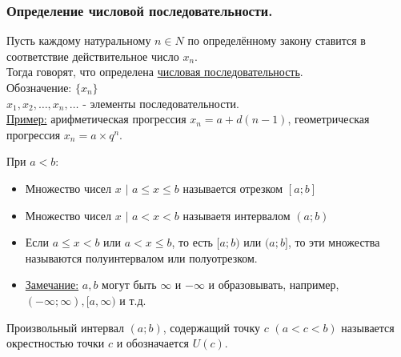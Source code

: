 \documentclass[12pt]{article}
\begin{document}
    \subsubsection*{Определение числовой последовательности.}
    \noindent Пусть каждому натуральному $n \in N$ по определённому закону ставится в соответствие действительное число $x_n$.\\
    Тогда говорят, что определена \underline{числовая последовательность}.\\
    Обозначение: $\{x_n\}$\\
    $x_{1}, x_{2}, \dots, x_n, \dots$ - элементы последовательности.\\
    \underline{Пример:} арифметическая прогрессия $x_n = a + d(n-1)$, геометрическая прогрессия $x_n = a \times q^n$.\par\noindent
    При $a < b$:
    \begin{itemize}
        \item Множество чисел $x$ $|$ $a \le x \le b$ называется отрезком $[a; b]$
        \item Множество чисел $x$ $|$ $a < x < b$ называетя интервалом $(a; b)$
        \item Если $a \le x < b$ или $a < x \le b$, то есть $[a; b)$ или $(a; b]$, то эти множества называются полуинтервалом или полуотрезком.
        \item \underline{Замечание:} $a, b$ могут быть $\infty$ и $-\infty$ и образовывать, например, $(-\infty; \infty), [a, \infty)$ и т.д.
    \end{itemize}
    Произвольный интервал $(a; b)$, содержащий точку $c$ $(a < c < b)$ называется окрестностью точки $c$ и обозначается $U(c)$.
\end{document}

